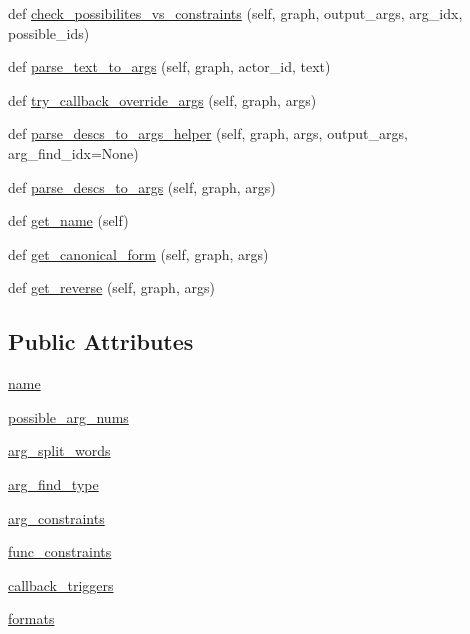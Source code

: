 \begin{DoxyCompactItemize}
\item 
def \hyperlink{classlight__chats_1_1graph_1_1GraphFunction_af627ff84086a094b84da04e30a97779e}{check\+\_\+possibilites\+\_\+vs\+\_\+constraints} (self, graph, output\+\_\+args, arg\+\_\+idx, possible\+\_\+ids)
\item 
def \hyperlink{classlight__chats_1_1graph_1_1GraphFunction_a3b6764b365baf7471e53651adf83706b}{parse\+\_\+text\+\_\+to\+\_\+args} (self, graph, actor\+\_\+id, text)
\item 
def \hyperlink{classlight__chats_1_1graph_1_1GraphFunction_a9769b13542f28f04977e374057bbc017}{try\+\_\+callback\+\_\+override\+\_\+args} (self, graph, args)
\item 
def \hyperlink{classlight__chats_1_1graph_1_1GraphFunction_a33a25a071385ffbd0a222cab65c543d4}{parse\+\_\+descs\+\_\+to\+\_\+args\+\_\+helper} (self, graph, args, output\+\_\+args, arg\+\_\+find\+\_\+idx=None)
\item 
def \hyperlink{classlight__chats_1_1graph_1_1GraphFunction_a8b76e8a8bb07f75abd081e220683dbd4}{parse\+\_\+descs\+\_\+to\+\_\+args} (self, graph, args)
\item 
def \hyperlink{classlight__chats_1_1graph_1_1GraphFunction_a6fb123ff0ec87dde23a5ce8a1614bbbe}{get\+\_\+name} (self)
\item 
def \hyperlink{classlight__chats_1_1graph_1_1GraphFunction_a0994341bec72be122101ce59da936882}{get\+\_\+canonical\+\_\+form} (self, graph, args)
\item 
def \hyperlink{classlight__chats_1_1graph_1_1GraphFunction_aa7929e44e5afafd4d27418c7fe5a2fe0}{get\+\_\+reverse} (self, graph, args)
\end{DoxyCompactItemize}
\subsection*{Public Attributes}
\begin{DoxyCompactItemize}
\item 
\hyperlink{classlight__chats_1_1graph_1_1GraphFunction_afb7e1d1d49ff540be034f685f4d1e337}{name}
\item 
\hyperlink{classlight__chats_1_1graph_1_1GraphFunction_a2d40c8aa5303afce9e93be14593fca78}{possible\+\_\+arg\+\_\+nums}
\item 
\hyperlink{classlight__chats_1_1graph_1_1GraphFunction_a20251500fbafb95c381e0c0bf9f37376}{arg\+\_\+split\+\_\+words}
\item 
\hyperlink{classlight__chats_1_1graph_1_1GraphFunction_a6845a255ccdfcaa58debca3157f7adb7}{arg\+\_\+find\+\_\+type}
\item 
\hyperlink{classlight__chats_1_1graph_1_1GraphFunction_a88e5637deee00b7f2f5d682afea0e85d}{arg\+\_\+constraints}
\item 
\hyperlink{classlight__chats_1_1graph_1_1GraphFunction_a46da34454c8776f43d4102c74a650334}{func\+\_\+constraints}
\item 
\hyperlink{classlight__chats_1_1graph_1_1GraphFunction_a5fc1640403f59d0358e1dccea3682487}{callback\+\_\+triggers}
\item 
\hyperlink{classlight__chats_1_1graph_1_1GraphFunction_aa5b75544ede241f8635e4d6c99ed6a3b}{formats}
\end{DoxyCompactItemize}
